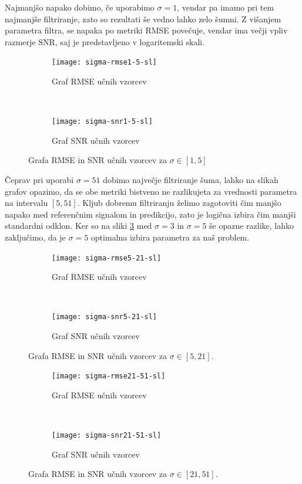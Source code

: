 Najmanjšo napako dobimo, če uporabimo $\sigma=1$, vendar pa imamo pri tem najmanjše filtriranje, zato so rezultati še vedno lahko zelo šumni. Z višanjem parametra filtra, se napaka po metriki RMSE povečuje, vendar ima večji vpliv razmerje SNR, saj je predstavljeno v logaritemski skali. 

\begin{figure}[!htb]
	\centering
	\begin{subfigure}[t]{0.45\columnwidth}
		\texttt{[image: sigma-rmse1-5-sl]}
		\caption{Graf RMSE  učnih vzorcev }
		\label{fig:sigma-rmse1-5}
	\end{subfigure}
	~
	\begin{subfigure}[t]{0.45\columnwidth}
		\texttt{[image: sigma-snr1-5-sl]}
		\caption{Graf SNR  učnih vzorcev}
		\label{fig:sigma-snr1-5}
	\end{subfigure}
	\caption{Grafa RMSE in SNR učnih vzorcev za \mbox{$\sigma \in [1,5]$}}
	\label{fig:sigma1-5}
\end{figure}

Čeprav pri uporabi $\sigma=51$ dobimo največje filtriranje šuma, lahko na slikah grafov opazimo, da se obe metriki bistveno ne razlikujeta za vrednosti parametra na intervalu $[5,51]$. Kljub dobremu filtriranju želimo zagotoviti čim manjšo napako med referenčnim signalom in predikcijo, zato je logična izbira čim manjši standardni odklon. Ker so na sliki \ref{fig:sigma1-5} med $\sigma=3$ in $\sigma=5$ še opazne razlike, lahko zaključimo, da je $\sigma=5$ optimalna izbira parametra za naš problem. 


\begin{figure}[!htb]
	\centering
	\begin{subfigure}[t]{0.45\columnwidth}
		\texttt{[image: sigma-rmse5-21-sl]}
		\caption{Graf RMSE  učnih vzorcev}
		\label{fig:sigma-rmse5-21}
	\end{subfigure}
	~
	\begin{subfigure}[t]{0.45\columnwidth}
		\texttt{[image: sigma-snr5-21-sl]}
		\caption{Graf SNR  učnih vzorcev}
		\label{fig:sigma-snr5-21}
	\end{subfigure}
	\caption[Grafa RMSE in SNR učnih vzorcev za \mbox{$\sigma \in [5,21]$}]{Grafa RMSE in SNR učnih vzorcev za \mbox{$\sigma \in [5,21]$}.}
	\label{fig:sigma5-21}
\end{figure}



\begin{figure}[!htb]
	\centering
	\begin{subfigure}[t]{0.45\columnwidth}
		\texttt{[image: sigma-rmse21-51-sl]}
		\caption{Graf RMSE učnih vzorcev}
		\label{fig:sigma-rmse21-51}
	\end{subfigure}
	~
	\begin{subfigure}[t]{0.45\columnwidth}
		\texttt{[image: sigma-snr21-51-sl]}
		\caption{Graf SNR  učnih vzorcev}
		\label{fig:sigma-snr21-51}
	\end{subfigure}
	\caption[Grafa RMSE in SNR učnih vzorcev za \mbox{$\sigma \in [21,51]$}]{Grafa RMSE in SNR učnih vzorcev za \mbox{$\sigma \in [21,51]$}.}
	\label{fig:sigma21-51}
\end{figure}


